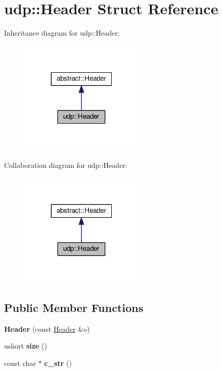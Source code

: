 \hypertarget{structudp_1_1Header}{}\section{udp\+:\+:Header Struct Reference}
\label{structudp_1_1Header}


Inheritance diagram for udp\+:\+:Header\+:
\nopagebreak
\begin{figure}[H]
\begin{center}
\leavevmode
\includegraphics[width=169pt]{structudp_1_1Header__inherit__graph}
\end{center}
\end{figure}


Collaboration diagram for udp\+:\+:Header\+:
\nopagebreak
\begin{figure}[H]
\begin{center}
\leavevmode
\includegraphics[width=169pt]{structudp_1_1Header__coll__graph}
\end{center}
\end{figure}
\subsection*{Public Member Functions}
\begin{DoxyCompactItemize}
\item 
{\bfseries Header} (const \hyperlink{structudp_1_1Header}{Header} \&o)\hypertarget{structudp_1_1Header_a4834b505432f80ca2eb9db6d51ab2c00}{}\label{structudp_1_1Header_a4834b505432f80ca2eb9db6d51ab2c00}

\item 
ushort {\bfseries size} ()\hypertarget{structudp_1_1Header_aeb0e9c82b2e6471758d8731ed590a502}{}\label{structudp_1_1Header_aeb0e9c82b2e6471758d8731ed590a502}

\item 
const char $\ast$ {\bfseries c\+\_\+str} ()\hypertarget{structudp_1_1Header_a9e39bb61a6c644edb6861f8fcb7b927d}{}\label{structudp_1_1Header_a9e39bb61a6c644edb6861f8fcb7b927d}

\end{DoxyCompactItemize}
